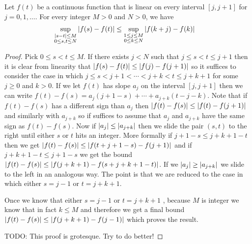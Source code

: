 \begin{lem}\label{ModulusOfContinuityOfPL}Let $f(t)$ be a continuous function that is linear on every
  interval $[j,j+1]$ for $j=0, 1, \dotsc$.  For every integer $M
  > 0$ and $N > 0$, we have
\begin{align*}
\sup_{\substack{\left \vert s -t \right \vert \leq M \\ 0 \leq s,t
    \leq N} } \left \vert f(s) - f(t) \right \vert
&\leq
\sup_{\substack{1 \leq j \leq M \\ 0 \leq k
    \leq N}} \left \vert f(k+j) - f(k) \right \vert
\end{align*}
\end{lem}
\begin{proof}
Pick $0 \leq s<t \leq M$.  If there exists $j < N$ such that $j \leq s
< t \leq j+1$ then it is clear from linearity  that $\left \vert f(s) - f(t) \right \vert
\leq \left \vert f(j) - f(j+1) \right \vert$ so it suffices to consider the case in which 
$j \leq s < j +1 < \dotsb < j+k < t \leq j+k+1$ for some $j \geq 0$ and $k
> 0$.  If we let $f(t)$ has slope $a_j$ on the interval $[j,j+1]$
then we can write $f(t) - f(s) = a_{j}(j+1 -s) + \dotsb + a_{j+k}(t -
j -k)$.  Note that
if $f(t) - f(s)$ has a different sign  than $a_j$ then $\left \vert f(t) -
  f(s) \right \vert \leq \left \vert f(t) -  f(j+1) \right \vert$ and similarly with $a_{j+k}$ so if
suffices to assume that $a_j$ and $a_{j+k}$ have the same sign as
$f(t)-f(s)$.  Now if $\left \vert a_j \right \vert \leq \left \vert a_{j+k} \right \vert$ then we slide the
pair $(s,t)$ to the right until either $s$ or $t$ hits an integer.
More formally if $j+1 - s \leq j+k+1 -t$ then we get
$\left \vert f(t) -
  f(s) \right \vert \leq \left \vert f(t + j+1-s) - f(j+1) \right \vert$ and if $j+k+1 -t \leq j+1 -
  s$
we get the bound $\left \vert f(t) -
  f(s) \right \vert \leq \left \vert f(j+k+1) - f(s + j+k+1 -t) \right \vert$.  If we $\left \vert a_j \right \vert \geq
\left \vert a_{j+k} \right \vert$ we slide to the left in an analogous way.  The point is
that we are reduced to the case in which either $s=j-1$ or $t=j+k+1$.

Once we know that either $s=j-1$ or $t=j+k+1$ , because $M$ is integer
we know that in fact $k \leq M$ and therefore we get a final bound
$\left \vert f(t) - f(s) \right \vert \leq \left \vert f(j+k+1) - f(j-1) \right \vert$ which proves the
result.

TODO: This proof is grotesque.  Try to do better!
\end{proof}

